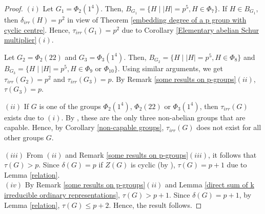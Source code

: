 \documentclass[a4paper,11pt]{amsart}
\numberwithin{equation}{section}
\numberwithin{equation}{subsection}
\newcommand{\poonam}[1]{{\color{blue} #1}}
\begin{document}
\begin{proof}
$(i)$ Let $G_1 = \Phi_{2}(1^{4})$. Then, $B_{G_1}= \{H \mid |H|= p^5, H \in \Phi_{7} \}$. If $H \in B_{G_1}$, then $\delta_{irr}(H)= p^2$ in view of Theorem \ref{embedding degree of a p group with cyclic centre}. Hence, $\tau_{irr}(G_1)= p^2$ due to Corollary \ref{Elementary abelian Schur multiplier}$(i)$.

Let $G_2 = \Phi_2(22)$ and $G_3 = \Phi_{3}(1^{4})$. Then, $B_{G_2}= \{H \mid |H|= p^5, H \in \Phi_{8} \}$ and $B_{G_3}= \{H \mid |H|= p^5, H \in \Phi_{9} \text{ or } \Phi_{10}\}$. Using similar arguments, we get $\tau_{irr}(G_2)= p^2$ and $\tau_{irr}(G_3)= p$. By Remark \ref{some results on p-groups}$(ii)$, $\tau(G_3)= p$. 



$(ii)$ If $G$ is one of the groups $\Phi_2(1^4)$, $\Phi_2(22)$ or $\Phi_3(1^4)$, then $\tau_{irr}(G)$ exists due to $(i)$. By \cite{hasanat}, these are the only three non-abelian groups that are capable. Hence, by Corollary \ref{non-capable groups}, $\tau_{irr}(G)$ does not exist for all other groups $G$.

$(iii)$ From $(ii)$ and Remark \ref{some results on p-groups}$(iii)$, it follows that $\tau(G)>p$. Since $\delta(G)= p$ if $Z(G)$ is cyclic (by \cite[Theorem 3.1(3)]{kaur}), $\tau(G)= p+1$ due to Lemma \ref{relation}. \\
$(iv)$ By Remark \ref{some results on p-groups}$(ii)$ and Lemma \ref{direct sum of k irreducible ordinary representations}, $\tau(G)>p+1$. Since $\delta(G)= p+1$, by Lemma \ref{relation}, $\tau(G) \leq p+2$. Hence, the result follows.  

\end{proof}
\end{document}
